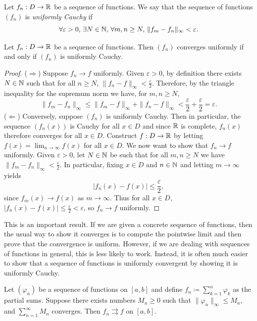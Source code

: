 \documentclass[../analysis1.tex]{subfiles}
\begin{document}
\begin{definition}
    \begin{shaded*}
        Let $f_n:D\to\mathbb{R}$ be a sequence of functions. We say that the sequence of functions $(f_n)$ is \textit{uniformly Cauchy} if
        \[\forall\varepsilon>0,\, \exists N\in\mathbb{N},\, \forall m,n\ge N,\, \|f_m-f_n\|_\infty <\varepsilon.\]
    \end{shaded*}
\end{definition}

\begin{lemma}
\label{lem:cauchyuniformequivalent}
    \begin{shaded*}
        Let $f_n:D\to\mathbb{R}$ be a sequence of functions. Then $(f_n)$ converges uniformly if and only if $(f_n)$ is uniformly Cauchy.
    \end{shaded*}
\end{lemma}
\begin{proof}
    ($\Rightarrow$) Suppose $f_n\to f$ uniformly. Given $\varepsilon>0$, by definition there exists $N\in\mathbb{N}$ such that for all $n\ge N$, $\|f_n-f\|_\infty <\frac{\varepsilon}{2}$. Therefore, by the triangle inequality for the supremum norm we have, for $m,n \ge N$,
    \[\|f_m-f_n\|_\infty\le \|f_m-f\|_\infty + \|f_n-f\|_\infty <\frac{\varepsilon}{2}+\frac{\varepsilon}{2}=\varepsilon.\]
    ($\Leftarrow$) Conversely, suppose $(f_n)$ is uniformly Cauchy. Then in particular, the sequence $(f_n(x))$ is Cauchy for all $x\in D$ and since $\mathbb{R}$ is complete, $f_n(x)$ therefore converges for all $x\in D$. Construct $f:D\to\mathbb{R}$ by letting $f(x)=\lim_{n\to\infty}f(x)$ for all $x\in D$. We now want to show that $f_n\to f$ uniformly. Given $\varepsilon>0$, let $N\in\mathbb{N}$ be such that for all $m,n\ge N$ we have $\|f_m-f_n\|_\infty <\frac{\varepsilon}{2}.$ In particular, fixing $x\in D$ and $n\in\mathbb{N}$ and letting $m\to\infty$ yields \[|f_n(x)-f(x)|\le \frac{\varepsilon}{2},\]
    since $f_m(x)\to f(x)$ as $m\to\infty$. Thus for all $x\in D$, $|f_n(x)-f(x)|\le \frac{\varepsilon}{2}<\varepsilon$, so $f_n\to f$ uniformly.\qedhere
\end{proof}
This is an important result. If we are given a concrete sequence of functions, then the usual way to show it converges is to compute the pointwise limit and then prove that the convergence is uniform. However, if we are dealing with sequences of functions in general, this is less likely to work. Instead, it is often much easier to show that a sequence of functions is uniformly convergent by showing it is uniformly Cauchy.
\begin{theorem}
\label{thm:wm}
    \begin{shaded*}
        Let $(\varphi_n)$ be a sequence of functions on $[a,b]$ and define $f_n\coloneqq \sum_{k=1}^n\varphi_k$ as the partial sums. Suppose there exists numbers $M_n\ge 0$ such that $\| \varphi_n\|_\infty \le M_n$, and $\sum_{n=1}^{\infty} M_n$ converges. Then $f_n\rightrightarrows f$ on $[a,b]$.
    \end{shaded*}
\end{theorem}
\end{document}
